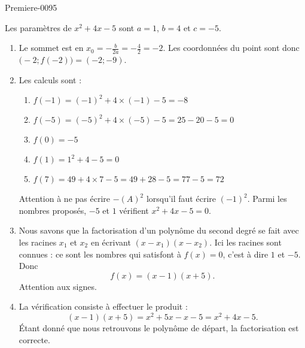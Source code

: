 
\begin{corrige}{Premiere-0095}

    Les paramètres de \( x^2+4x-5\) sont \( a=1\), \( b=4\) et \( c=-5\).
    \begin{enumerate}
        \item
            Le sommet est en \( x_0=-\frac{ b }{ 2a }=-\frac{ 4 }{ 2 }=-2\). Les coordonnées du point sont donc \( \big( -2;f(-2) \big)=(-2;-9)\).
        \item
            Les calculs sont :
            \begin{multicols}{2}

                \begin{enumerate}
                    \item
                        $f(-1)=(-1)^2+4\times (-1)-5=-8$
                    \item
                        $f(-5)=(-5)^2+4\times (-5)-5=25-20-5=0$
                    \item
                        \( f(0)=-5\)
                    \item
                        \( f(1)=1^2+4-5=0\)
                    \item
                        \( f(7)=49+4\times 7-5=49+28-5=77-5=72\)
                \end{enumerate}
            \end{multicols}
            Attention à ne pas écrire \( -(A)^2\) lorsqu'il faut écrire \( (-1)^2\). Parmi les nombres proposés, \( -5\) et \( 1\) vérifient \( x^2+4x-5=0\).
        \item
            Nous savons que la factorisation d'un polynôme du second degré se fait avec les racines \( x_1\) et \( x_2\) en écrivant \( (x-x_1)(x-x_2)\). Ici les racines sont connues : ce sont les nombres qui satisfont à \( f(x)=0\), c'est à dire \( 1\) et \( -5\). Donc
            \begin{equation}
                f(x)=(x-1)(x+5).
            \end{equation}
            Attention aux signes.
        \item
            La vérification consiste à effectuer le produit :
            \begin{equation}
                (x-1)(x+5)=x^2+5x-x-5=x^2+4x-5.
            \end{equation}
            Étant donné que nous retrouvons le polynôme de départ, la factorisation est correcte.
    \end{enumerate}

\end{corrige}
